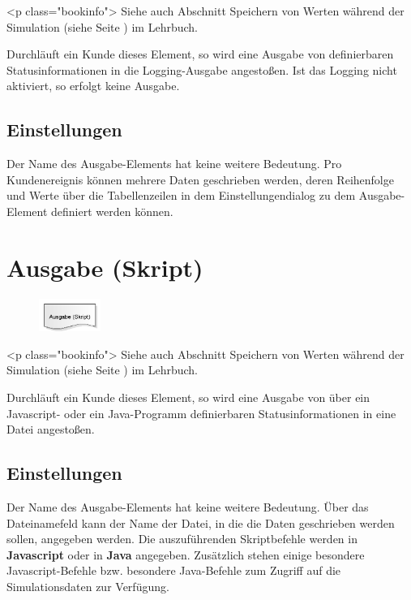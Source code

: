 <p class="bookinfo">
Siehe auch Abschnitt Speichern von Werten während der Simulation (siehe Seite \pageref{ref:book:9.3.3}) im Lehrbuch.

Durchläuft ein Kunde dieses Element, so wird eine Ausgabe von definierbaren Statusinformationen in
die Logging-Ausgabe angestoßen. Ist das Logging nicht aktiviert, so erfolgt keine Ausgabe.

\subsection*{Einstellungen}

Der Name des Ausgabe-Elements hat keine weitere Bedeutung. Pro Kundenereignis können mehrere Daten
geschrieben werden, deren Reihenfolge und Werte über die Tabellenzeilen in dem Einstellungendialog zu
dem Ausgabe-Element definiert werden können.


\section{Ausgabe (Skript)}
\label{ref:ModelElementOutputJS}

\begin{figure}
\vspace{-22pt}
\includegraphics[width=2cm]{imageModelElementOutputJS.png}
\vspace{-22pt}
\end{figure}

<p class="bookinfo">
Siehe auch Abschnitt Speichern von Werten während der Simulation (siehe Seite \pageref{ref:book:9.3.3}) im Lehrbuch.

Durchläuft ein Kunde dieses Element, so wird eine Ausgabe von über ein Javascript-
oder ein Java-Programm definierbaren Statusinformationen in eine Datei angestoßen.

\subsection*{Einstellungen}

Der Name des Ausgabe-Elements hat keine weitere Bedeutung. Über das Dateinamefeld kann der Name der Datei,
in die die Daten geschrieben werden sollen, angegeben werden. Die auszuführenden Skriptbefehle werden in
\textbf{Javascript} oder in \textbf{Java} angegeben. Zusätzlich stehen einige
besondere Javascript-Befehle bzw. besondere Java-Befehle 
zum Zugriff auf die Simulationsdaten zur Verfügung.

